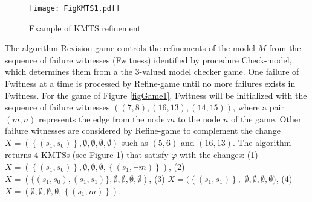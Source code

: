 \documentclass{llncs}
\begin{document}
\begin{figure}[h]
\centering
\texttt{[image: FigKMTS1.pdf]}
\caption{Example of KMTS refinement}
\label{figKmts1}
\end{figure}
\vspace*{-0.5cm}

The algorithm Revision-game controls the refinements of the model $M$ from the sequence of failure witnesses (Fwitness) identified by procedure Check-model, which determines them from a the 3-valued model checker game. One failure of Fwitness at a time is processed by Refine-game until no more failures exists in Fwitness. For the game of Figure \ref{figGame1}, Fwitness will be initialized with the sequence of failure witnesses $((7,8), (16,13), (14,15))$, where a pair $(m,n)$ represents the edge from the node $m$ to the node $n$ of the game. Other failure witnesses are considered by Refine-game to complement the change $X = (\left\{(s_{1},s_{0})\right\}, \emptyset, \emptyset, \emptyset, \emptyset)$ such as $(5,6)$ and $(16,13)$. The algorithm returns $4$ KMTSs (see Figure \ref{figKmts1}) that satisfy $\varphi$ with the changes: (1) $X = (\left\{(s_{1},s_{0})\right\}, \emptyset, \emptyset, \emptyset, \left\{(s_{1},\neg m)\right\})$, (2) $X = (\{(s_{1},s_{0}), (s_{1},s_{1})\}, \emptyset, \emptyset, \emptyset, \emptyset)$, (3) $X = (\left\{(s_{1},s_{1})\right\},$ $ \emptyset, \emptyset, \emptyset, \emptyset)$, (4) $X = (\emptyset, \emptyset, \emptyset, \emptyset, \left\{(s_{1},m)\right\})$. 

\end{document}
